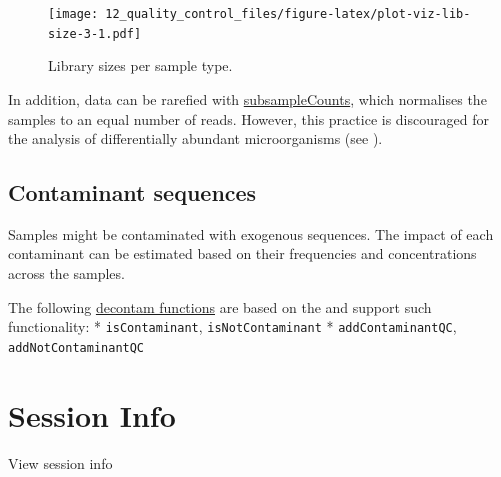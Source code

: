 \documentclass[
]{book}
\begin{document}
\begin{figure}
\centering
\texttt{[image: 12\_quality\_control\_files/figure-latex/plot-viz-lib-size-3-1.pdf]}
\caption{\label{fig:plot-viz-lib-size-3}Library sizes per sample type.}
\end{figure}

In addition, data can be rarefied with \href{https://microbiome.github.io/mia/reference/subsampleCounts.html}{subsampleCounts}, which normalises the samples to an equal number of reads. However, this practice is discouraged for the analysis of differentially abundant microorganisms (see \citep{mcmurdie2014waste}).

\hypertarget{contaminant-sequences}{%
\subsection{Contaminant sequences}\label{contaminant-sequences}}

Samples might be contaminated with exogenous sequences. The impact of each contaminant can be estimated based on their frequencies and concentrations across the samples.

The following \href{https://microbiome.github.io/mia/reference/isContaminant.html}{decontam functions} are based on the \citep{davis2018simple} and support such functionality:
* \texttt{isContaminant}, \texttt{isNotContaminant}
* \texttt{addContaminantQC}, \texttt{addNotContaminantQC}

\hypertarget{session-info-2}{%
\section*{Session Info}\label{session-info-2}}

View session info
\end{document}
